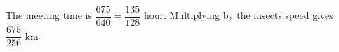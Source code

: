The meeting time is $\dfrac{675}{640}=\dfrac{135}{128}$ hour. Multiplying by the insect\textquotesingle s speed gives $\boxed{\dfrac{675}{256}\text{ km}}$.
